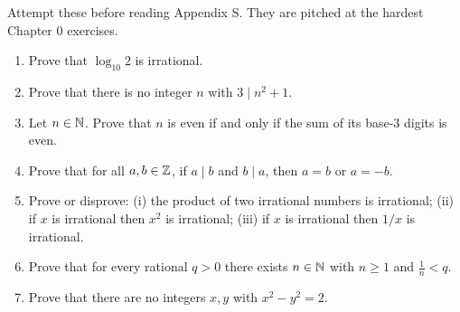 Attempt these before reading Appendix S. They are pitched at the hardest Chapter 0 exercises.
\begin{stretchbox}[0]
\begin{enumerate}[label=\textbf{S0.\arabic*}, leftmargin=3em]
\item Prove that $\log_{10}2$ is irrational. 
\item Prove that there is no integer $n$ with $3\mid n^2+1$. 
\item Let $n\in\mathbb{N}$. Prove that $n$ is even if and only if the sum of its base-$3$ digits is even. 
\item Prove that for all $a,b\in\mathbb{Z}$, if $a\mid b$ and $b\mid a$, then $a=b$ or $a=-b$. 
\item Prove or disprove: (i) the product of two irrational numbers is irrational; (ii) if $x$ is irrational then $x^2$ is irrational; (iii) if $x$ is irrational then $1/x$ is irrational.
\item Prove that for every rational $q>0$ there exists $n\in\mathbb{N}$ with $n\ge1$ and $\frac1n<q$. 
\item Prove that there are no integers $x,y$ with $x^2-y^2=2$. 
\end{enumerate}
\end{stretchbox}
